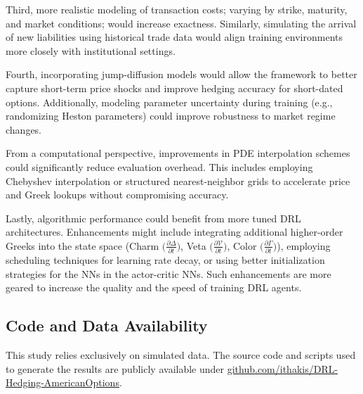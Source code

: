 \documentclass[a4paper,fleqn]{cas-dc}
\begin{document}
Third, more realistic modeling of transaction costs; varying by strike, maturity, and market conditions; would increase exactness. Similarly, simulating the arrival of new liabilities using historical trade data would align training environments more closely with institutional settings.

Fourth, incorporating jump-diffusion models would allow the framework to better capture short-term price shocks and improve hedging accuracy for short-dated options. Additionally, modeling parameter uncertainty during training (e.g., randomizing Heston parameters) could improve robustness to market regime changes.

From a computational perspective, improvements in PDE interpolation schemes could significantly reduce evaluation overhead. This includes employing Chebyshev interpolation or structured nearest-neighbor grids to accelerate price and Greek lookups without compromising accuracy.


Lastly, algorithmic performance could benefit from more tuned DRL architectures. Enhancements might include integrating additional higher-order Greeks into the state space (Charm $\big( \frac{\partial \Delta}{\partial t} \big)$, Veta $\big( \frac{\partial \mathcal{V}}{\partial t} \big)$, Color $\big( \frac{\partial \Gamma}{\partial t} \big)$), employing scheduling techniques for learning rate decay, or using better initialization strategies for the NNs in the actor-critic NNs. Such enhancements are more geared to increase the quality and the speed of training DRL agents.

\subsection*{Code and Data Availability}
This study relies exclusively on simulated data. The source code and scripts 
used to generate the results are publicly available under 
\href{https://github.com/ithakis/DRL-Hedging-AmericanOptions}{github.com/ithakis/DRL-Hedging-AmericanOptions}.





\end{document}
